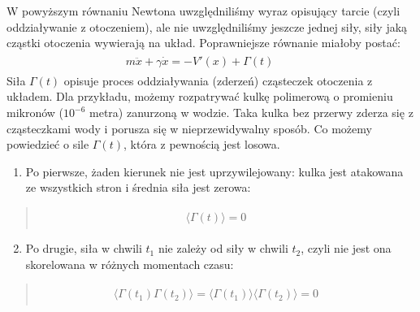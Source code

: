 \documentclass[a4paper,12pt,polish]{sphinxmanual}
\begin{document}
W powyższym równaniu Newtona uwzględniliśmy wyraz opisujący tarcie (czyli oddziaływanie z otoczeniem), ale nie uwzględniliśmy jeszcze jednej siły, siły jaką cząstki otoczenia wywierają na układ. Poprawniejsze równanie miałoby postać:
\label{ch3/chIII011:equation-eqn2}\begin{gather}
\begin{split}m \ddot x + \gamma \dot x = -V'(x) + \Gamma (t) \qquad\end{split}\label{ch3/chIII011-eqn2}
\end{gather}
Siła $\Gamma(t)$ opisuje proces oddziaływania (zderzeń) cząsteczek otoczenia z układem. Dla przykładu, możemy rozpatrywać kulkę polimerową o promieniu mikronów ($10^{-6}$ metra) zanurzoną w wodzie. Taka kulka bez przerwy zderza się z cząsteczkami wody i porusza się w nieprzewidywalny sposób. Co możemy powiedzieć o sile $\Gamma(t)$, która z pewnością jest losowa.
\begin{enumerate}
\item {} 
Po pierwsze, żaden kierunek nie jest uprzywilejowany: kulka jest atakowana ze wszystkich stron i średnia siła jest zerowa:

\end{enumerate}
\begin{quote}
\label{ch3/chIII011:equation-eqn3}\begin{gather}
\begin{split} \langle \Gamma(t) \rangle = 0 \qquad\end{split}\label{ch3/chIII011-eqn3}
\end{gather}\end{quote}
\begin{enumerate}
\setcounter{enumi}{1}
\item {} 
Po drugie, siła w chwili $t_1$ nie zależy od siły w chwili $t_2$, czyli nie jest ona skorelowana w różnych momentach czasu:

\end{enumerate}
\begin{quote}
\label{ch3/chIII011:equation-eqn4}\begin{gather}
\begin{split} \langle \Gamma(t_1) \Gamma(t_2)\rangle = \langle\Gamma(t_1)\rangle \langle\Gamma(t_2)\rangle = 0 \qquad\end{split}\label{ch3/chIII011-eqn4}
\end{gather}\end{quote}
\end{document}
